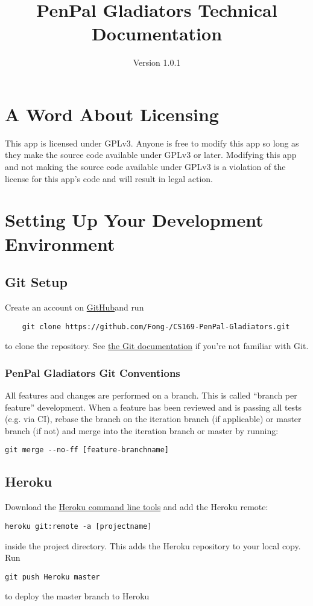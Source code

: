 \documentclass[12pt]{article}
\title{PenPal Gladiators Technical Documentation}
\author{Version 1.0.1}
\begin{document}
\maketitle
\tableofcontents

\section{A Word About Licensing}
This app is licensed under GPLv3.  Anyone is free to modify this app so long as
they make the source code available under GPLv3 or later.  Modifying this app
and not making the source code available under GPLv3 is a violation of the
license for this app’s code and will result in legal action.

\section{Setting Up Your Development Environment}
\subsection{Git Setup}
Create an account on \href{https://github.com}{GitHub}and run
\begin{verbatim}
    git clone https://github.com/Fong-/CS169-PenPal-Gladiators.git
\end{verbatim}
to clone the repository.  See \href{https://git-scm.herokuapp.com/docs}{the
Git documentation} if you're not familiar with Git.


\subsubsection{PenPal Gladiators Git Conventions}
All features and changes are performed on a branch.  This is called “branch per
feature” development.  When a feature has been reviewed and is passing all tests
(e.g. via CI), rebase the branch on the iteration branch (if applicable) or
master branch (if not) and merge into the iteration branch or master by running:
\begin{verbatim}
git merge --no-ff [feature-branchname]
\end{verbatim}

\subsection{Heroku}
Download the \href{https://heroku.com}{Heroku command line tools} and add the Heroku remote:
\begin{verbatim}
heroku git:remote -a [projectname]
\end{verbatim}
inside the project directory. This adds the Heroku repository to your local
copy. Run
\begin{verbatim}
git push Heroku master
\end{verbatim}
to deploy the master branch to Heroku
\end{document}
